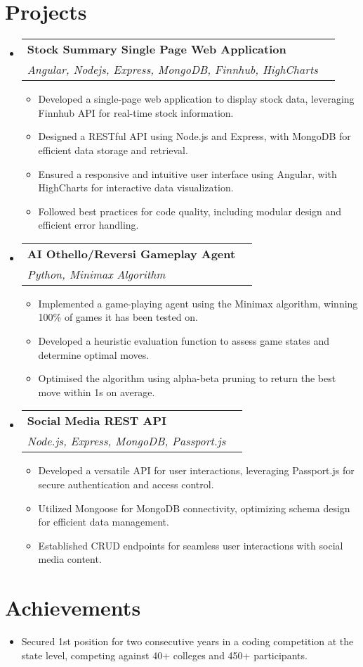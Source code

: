 \documentclass[letterpaper,11pt]{article}
\makeatletter
\newcommand{\resumeItem}[1]{
  \item\small{
    {#1 \vspace{-2pt}}
  }
}
\newcommand{\resumeProjectHeading}[1]{
    \item
    \begin{tabular*}{1.001\textwidth}{l@{\extracolsep{\fill}}r}
      \small#1\\
    \end{tabular*}\vspace{-7pt}
}
\newcommand{\resumeSubHeadingListStart}{\begin{itemize}[leftmargin=0.0in, label={}]}
\newcommand{\resumeSubHeadingListEnd}{\end{itemize}}
\newcommand{\resumeItemListStart}{\begin{itemize}}
\newcommand{\resumeItemListEnd}{\end{itemize}\vspace{-5pt}}
\makeatother
\begin{document}
\section{Projects}
\vspace{-2pt}
\resumeSubHeadingListStart
\resumeProjectHeading
{\textbf{Stock Summary Single Page Web Application} \\
  \emph{Angular, Nodejs, Express, MongoDB, Finnhub, HighCharts}}
\vspace{-3pt}
\resumeItemListStart
\resumeItem{Developed a single-page web application to display stock data, leveraging Finnhub API for real-time stock information.}
\resumeItem{Designed a RESTful API using Node.js and Express, with MongoDB for efficient data storage and retrieval.}
\resumeItem{Ensured a responsive and intuitive user interface using Angular, with HighCharts for interactive data visualization.}
\resumeItem{Followed best practices for code quality, including modular design and efficient error handling.}
\resumeItemListEnd
\vspace{-6pt}
\resumeProjectHeading
{\textbf{AI Othello/Reversi Gameplay Agent \href{https://github.com/KishanSeksaria/CSCI-561---Foundations-of-AI/tree/main/hw2}{\faGithub}} \\
  \emph{Python, Minimax Algorithm}}
\vspace{-3pt}
\resumeItemListStart
\resumeItem{Implemented a game-playing agent using the Minimax algorithm, winning 100\% of games it has been tested on.}
\resumeItem{Developed a heuristic evaluation function to assess game states and determine optimal moves.}
\resumeItem{Optimised the algorithm using alpha-beta pruning to return the best move within 1s on average.}
\resumeItemListEnd
\vspace{-6pt}
\resumeProjectHeading
{\textbf{Social Media REST API \href{https://github.com/KishanSeksaria/social-media-REST-api}{\faGithub}} \\
  \emph{Node.js, Express, MongoDB, Passport.js}}
\vspace{-3pt}
\resumeItemListStart
\resumeItem{Developed a versatile API for user interactions, leveraging Passport.js for secure authentication and access control.}
\resumeItem{Utilized Mongoose for MongoDB connectivity, optimizing schema design for efficient data management.}
\resumeItem{Established CRUD endpoints for seamless user interactions with social media content.}
\resumeItemListEnd
\resumeSubHeadingListEnd
\vspace{-12pt}


\section{Achievements}
\resumeItemListStart
\resumeItem{Secured 1st position for two consecutive years in a coding competition at the state level, competing against 40+ colleges and 450+ participants.}
\resumeItemListEnd
\end{document}
